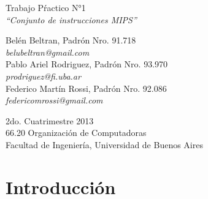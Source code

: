 \documentclass{article}
\begin{document}
\setcounter{page}{5}

\begin{titlepage}
	\vspace*{\fill}
	\begin{center}
		\huge{Trabajo Pŕactico N°1} \\
		\medskip
		\Huge \textit{``Conjunto de instrucciones MIPS''} \\
		
		\bigskip\bigskip\bigskip\bigskip\bigskip

		\Large Belén Beltran, Padrón Nro. 91.718 \\
		\large \textit{belubeltran@gmail.com} \\ \medskip
		\Large Pablo Ariel Rodriguez, Padrón Nro. 93.970 \\
		\large \textit{prodriguez@fi.uba.ar} \\ \medskip
		\Large Federico Martín Rossi, Padrón Nro. 92.086 \\
		\large \textit{federicomrossi@gmail.com} \\

		\bigskip\bigskip\bigskip\bigskip\bigskip\bigskip\bigskip

		\large 2do. Cuatrimestre 2013 \\ \smallskip
		\large 66.20 Organización de Computadoras \\ \smallskip
		\large Facultad de Ingeniería, Universidad de Buenos Aires \\ \smallskip

		\date{}
	\end{center}
	\vspace*{\fill}
\end{titlepage}

\newpage
\newpage \textit{}
\newpage



\tableofcontents
\newpage \textit{}
\newpage
{}




\section{Introducción}
	
\end{document}
